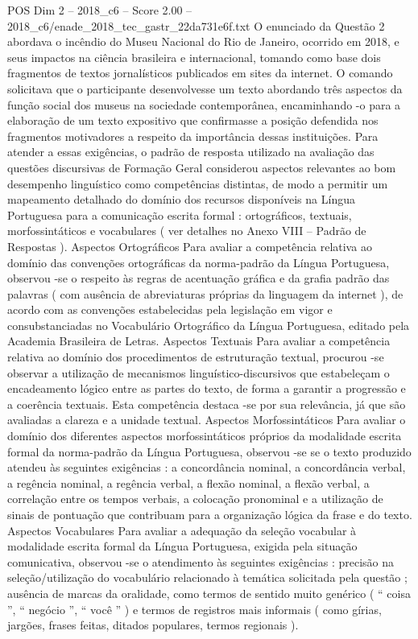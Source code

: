 \begin{textsample}{POS Dim 2 – 2018\_c6 – Score 2.00 – 2018\_c6/enade\_2018\_tec\_gastr\_22da731e6f.txt}
O enunciado da Questão 2 abordava o incêndio do Museu Nacional do Rio de Janeiro, ocorrido em 2018, e seus impactos na ciência brasileira e internacional, tomando como base dois fragmentos de textos jornalísticos publicados em sites da internet.
O comando solicitava que o participante desenvolvesse um texto abordando três aspectos da função social dos museus na sociedade contemporânea, encaminhando -o para a elaboração de um texto expositivo que confirmasse a posição defendida nos fragmentos motivadores a respeito da importância dessas instituições.
Para atender a essas exigências, o padrão de resposta utilizado na avaliação das questões discursivas de Formação Geral considerou aspectos relevantes ao bom desempenho linguístico como competências distintas, de modo a permitir um mapeamento detalhado do domínio dos recursos disponíveis na Língua Portuguesa para a comunicação escrita formal : ortográficos, textuais, morfossintáticos e vocabulares ( ver detalhes no Anexo VIII – Padrão de Respostas ).
Aspectos Ortográficos Para avaliar a competência relativa ao domínio das convenções ortográficas da norma-padrão da Língua Portuguesa, observou -se o respeito às regras de acentuação gráfica e da grafia padrão das palavras ( com ausência de abreviaturas próprias da linguagem da internet ), de acordo com as convenções estabelecidas pela legislação em vigor e consubstanciadas no Vocabulário Ortográfico da Língua Portuguesa, editado pela Academia Brasileira de Letras.
Aspectos Textuais Para avaliar a competência relativa ao domínio dos procedimentos de estruturação textual, procurou -se observar a utilização de mecanismos linguístico-discursivos que estabeleçam o encadeamento lógico entre as partes do texto, de forma a garantir a progressão e a coerência textuais.
Esta competência destaca -se por sua relevância, já que são avaliadas a clareza e a unidade textual.
Aspectos Morfossintáticos Para avaliar o domínio dos diferentes aspectos morfossintáticos próprios da modalidade escrita formal da norma-padrão da Língua Portuguesa, observou -se se o texto produzido atendeu às seguintes exigências : a concordância nominal, a concordância verbal, a regência nominal, a regência verbal, a flexão nominal, a flexão verbal, a correlação entre os tempos verbais, a colocação pronominal e a utilização de sinais de pontuação que contribuam para a organização lógica da frase e do texto.
Aspectos Vocabulares Para avaliar a adequação da seleção vocabular à modalidade escrita formal da Língua Portuguesa, exigida pela situação comunicativa, observou -se o atendimento às seguintes exigências : precisão na seleção/utilização do vocabulário relacionado à temática solicitada pela questão ; ausência de marcas da oralidade, como termos de sentido muito genérico ( “ coisa ”, “ negócio ”, “ você ” ) e termos de registros mais informais ( como gírias, jargões, frases feitas, ditados populares, termos regionais ).

\end{textsample}
